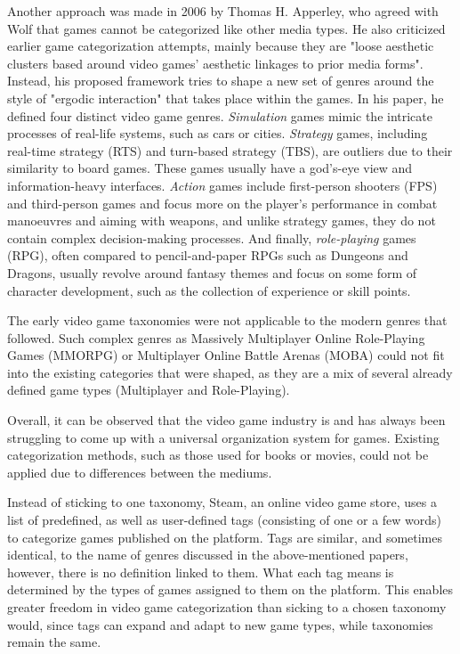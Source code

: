 Another approach was made in 2006 by Thomas H. Apperley, who agreed with Wolf that games cannot be categorized like other media types. He also criticized earlier game categorization attempts, mainly because they are "loose aesthetic clusters based around video games' aesthetic linkages to prior media forms"\cite{apperley2006genre}. Instead, his proposed framework tries to shape a new set of genres around the style of "ergodic interaction" that takes place within the games. In his paper, he defined four distinct video game genres. \textit{Simulation} games mimic the intricate processes of real-life systems, such as cars or cities. \textit{Strategy} games, including real-time strategy (RTS) and turn-based strategy (TBS), are outliers due to their similarity to board games. These games usually have a god's-eye view and information-heavy interfaces. \textit{Action} games include first-person shooters (FPS) and third-person games and focus more on the player's performance in combat manoeuvres and aiming with weapons, and unlike strategy games, they do not contain complex decision-making processes. And finally, \textit{role-playing} games (RPG), often compared to pencil-and-paper RPGs such as Dungeons and Dragons, usually revolve around fantasy themes and focus on some form of character development, such as the collection of experience or skill points.

The early video game taxonomies were not applicable to the modern genres that followed\cite{starosta2024tangled}. Such complex genres as Massively Multiplayer Online Role-Playing Games (MMORPG) or Multiplayer Online Battle Arenas (MOBA) could not fit into the existing categories that were shaped, as they are a mix of several already defined game types (Multiplayer and Role-Playing).

Overall, it can be observed that the video game industry is and has always been struggling to come up with a universal organization system for games. Existing categorization methods, such as those used for books or movies, could not be applied due to differences between the mediums\cite{lee2014facet}.

Instead of sticking to one taxonomy, Steam\cite{steam}, an online video game store, uses a list of predefined, as well as user-defined tags (consisting of one or a few words) to categorize games published on the platform. Tags are similar, and sometimes identical, to the name of genres discussed in the above-mentioned papers, however, there is no definition linked to them. What each tag means is determined by the types of games assigned to them on the platform. This enables greater freedom in video game categorization than sicking to a chosen taxonomy would, since tags can expand and adapt to new game types, while taxonomies remain the same.



